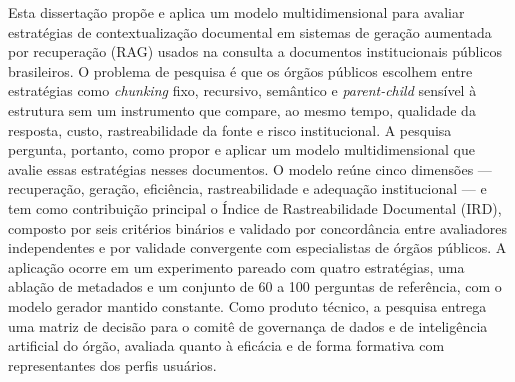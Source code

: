 
\begin{resumo}
Esta dissertação propõe e aplica um modelo multidimensional para avaliar
estratégias de contextualização documental em sistemas de geração aumentada por
recuperação (RAG) usados na consulta a documentos institucionais públicos
brasileiros. O problema de pesquisa é que os órgãos públicos escolhem entre
estratégias como \textit{chunking} fixo, recursivo, semântico e
\textit{parent-child} sensível à estrutura sem um instrumento que compare, ao
mesmo tempo, qualidade da resposta, custo, rastreabilidade da fonte e risco
institucional. A pesquisa pergunta, portanto, como propor e aplicar um modelo
multidimensional que avalie essas estratégias nesses documentos. O modelo
reúne cinco dimensões --- recuperação, geração, eficiência, rastreabilidade e
adequação institucional --- e tem como contribuição principal o Índice de
Rastreabilidade Documental (IRD), composto por seis critérios binários e
validado por concordância entre avaliadores independentes e por validade
convergente com especialistas de órgãos públicos. A aplicação ocorre em um
experimento pareado com quatro estratégias, uma ablação de metadados e um
conjunto de 60 a 100 perguntas de referência, com o modelo gerador mantido
constante. Como produto técnico, a pesquisa entrega uma matriz de decisão para
o comitê de governança de dados e de inteligência artificial do órgão, avaliada
quanto à eficácia e de forma formativa com representantes dos perfis usuários.
\end{resumo}
